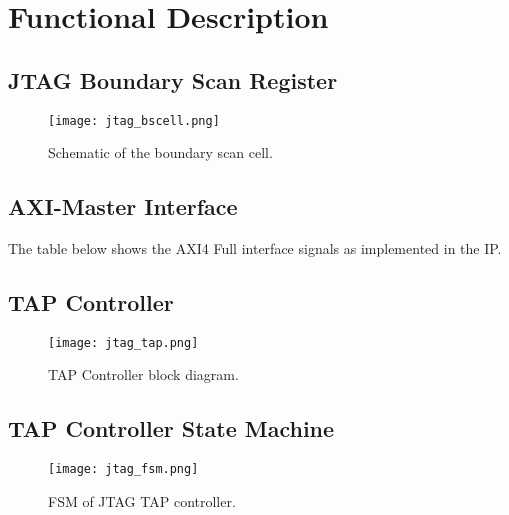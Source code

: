 \documentclass[fleqn,10pt]{SelfArx} %
\begin{document}
\section{Functional Description}

\subsection{JTAG Boundary Scan Register}
\begin{figure}[!ht]\centering %
	\texttt{[image: jtag\_bscell.png]}
	\caption{Schematic of the boundary scan cell.}
	\label{fig:jtag_fsm}
\end{figure}

\subsection{AXI-Master Interface}

The table below shows the AXI4 Full interface signals as implemented in the IP.

\begin{table}[h]
\centering
	\caption{Raptor Report}
	\label{tab:table-2}
\end{table}

\subsection{TAP Controller}
\begin{figure}[!ht]\centering %
	\texttt{[image: jtag\_tap.png]}
	\caption{TAP Controller block diagram.}
	\label{fig:tap_controller}
\end{figure}

\subsection{TAP Controller State Machine}
\begin{figure}[!ht]\centering %
	\texttt{[image: jtag\_fsm.png]}
	\caption{FSM of JTAG TAP controller.}
	\label{fig:jtag_fsm}
\end{figure}
\end{document}

